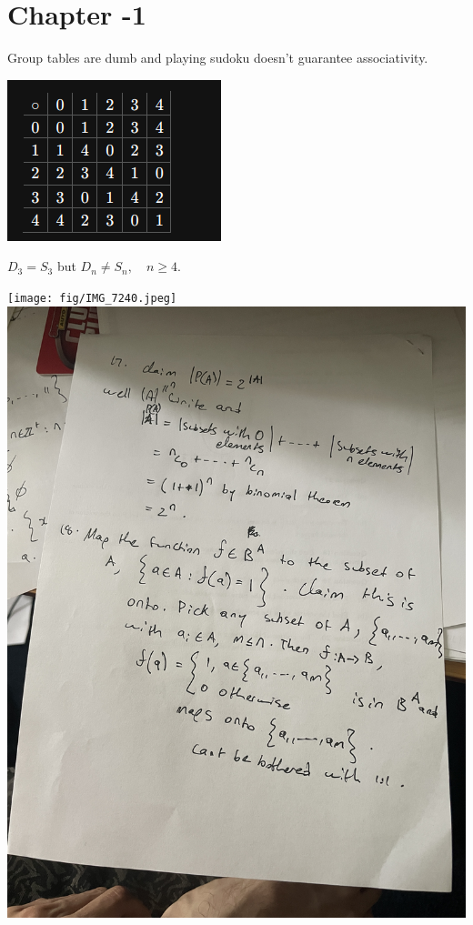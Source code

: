 \section*{Chapter -1}
Group tables are dumb and playing sudoku doesn't guarantee associativity.
\begin{center}
\includegraphics[scale=0.6, angle=-0]{fig/countergroup.png}
\end{center}
$D_3 = S_3$ but $D_n \neq S_n, \quad n \geq 4$.
\begin{center}
\texttt{[image: fig/IMG\_7240.jpeg]}
\includegraphics[scale=0.6, angle=-90]{fig/IMG_7241.jpeg}
\end{center}

